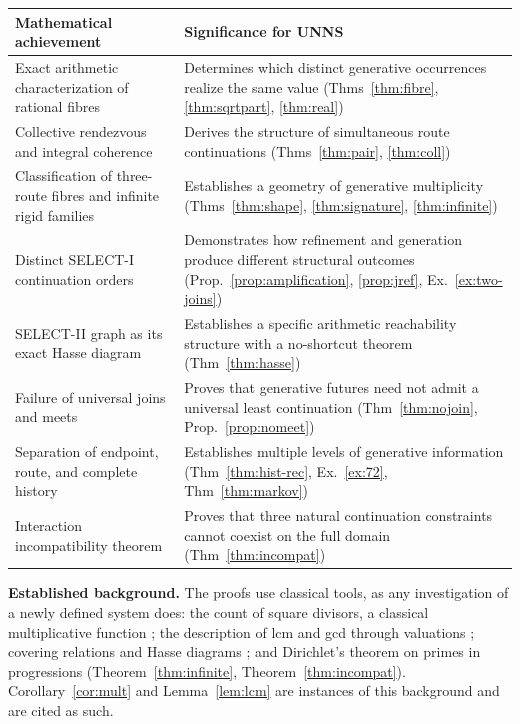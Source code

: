 \documentclass[11pt,oneside,openany]{book}
\theoremstyle{definition}
\theoremstyle{remark}
\begin{document}
\renewcommand{\arraystretch}{1.05}
\begin{center}
\small\begin{tabular}{|p{5.0cm}|p{9.2cm}|}
\hline \textbf{Mathematical achievement} & \textbf{Significance for UNNS}\\\hline
Exact arithmetic characterization of rational fibres & Determines which distinct generative occurrences realize the same value (Thms~\ref{thm:fibre}, \ref{thm:sqrtpart}, \ref{thm:real}) \\\hline
Collective rendezvous and integral coherence & Derives the structure of simultaneous route continuations (Thms~\ref{thm:pair}, \ref{thm:coll}) \\\hline
Classification of three-route fibres and infinite rigid families & Establishes a geometry of generative multiplicity (Thms~\ref{thm:shape}, \ref{thm:signature}, \ref{thm:infinite}) \\\hline
Distinct SELECT-I continuation orders & Demonstrates how refinement and generation produce different structural outcomes (Prop.~\ref{prop:amplification}, \ref{prop:jref}, Ex.~\ref{ex:two-joins}) \\\hline
SELECT-II graph as its exact Hasse diagram & Establishes a specific arithmetic reachability structure with a no-shortcut theorem (Thm~\ref{thm:hasse}) \\\hline
Failure of universal joins and meets & Proves that generative futures need not admit a universal least continuation (Thm~\ref{thm:nojoin}, Prop.~\ref{prop:nomeet}) \\\hline
Separation of endpoint, route, and complete history & Establishes multiple levels of generative information (Thm~\ref{thm:hist-rec}, Ex.~\ref{ex:72}, Thm~\ref{thm:markov}) \\\hline
Interaction incompatibility theorem & Proves that three natural continuation constraints cannot coexist on the full domain (Thm~\ref{thm:incompat}) \\\hline
\end{tabular}
\end{center}
\small

\textbf{Established background.} The proofs use classical tools, as any investigation of a newly defined system does: the count of square divisors, a classical multiplicative function \cite{oeis}; the description of lcm and gcd through valuations \cite{valdiv}; covering relations and Hasse diagrams \cite{martin}; and Dirichlet's theorem on primes in progressions (Theorem~\ref{thm:infinite}, Theorem~\ref{thm:incompat}). Corollary~\ref{cor:mult} and Lemma~\ref{lem:lcm} are instances of this background and are cited as such.
\end{document}
